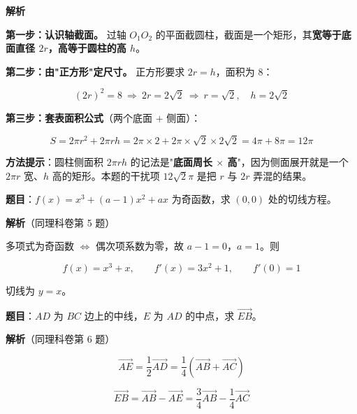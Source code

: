 \textbf{解析}

\textbf{第一步：认识轴截面。} 过轴 $O_1O_2$ 的平面截圆柱，截面是一个矩形，其\textbf{宽等于底面直径 $2r$，高等于圆柱的高 $h$}。

\textbf{第二步：由"正方形"定尺寸。} 正方形要求 $2r=h$，面积为 $8$：

\[(2r)^{2}=8\ \Longrightarrow\ 2r=2\sqrt2\ \Longrightarrow\ r=\sqrt2,\quad h=2\sqrt2\]

\textbf{第三步：套表面积公式}（两个底面 $+$ 侧面）：

\[S=2\pi r^{2}+2\pi rh=2\pi\times2+2\pi\times\sqrt2\times2\sqrt2=4\pi+8\pi=12\pi\]


\begin{gktip}
\textbf{方法提示}：圆柱侧面积 $2\pi rh$ 的记法是"\textbf{底面周长 $\times$ 高}"，因为侧面展开就是一个 $2\pi r$ 宽、$h$ 高的矩形。本题的干扰项 $12\sqrt2\pi$ 是把 $r$ 与 $2r$ 弄混的结果。
\end{gktip}

\par\medskip


\textbf{题目}：$f(x)=x^{3}+(a-1)x^{2}+ax$ 为奇函数，求 $(0,0)$ 处的切线方程。

\textbf{解析}（同理科卷第 5 题）

多项式为奇函数 $\iff$ 偶次项系数为零，故 $a-1=0$，$a=1$。则

\[f(x)=x^{3}+x,\qquad f'(x)=3x^{2}+1,\qquad f'(0)=1\]

切线为 $y=x$。


\par\medskip


\textbf{题目}：$AD$ 为 $BC$ 边上的中线，$E$ 为 $AD$ 的中点，求 $\overrightarrow{EB}$。

\textbf{解析}（同理科卷第 6 题）

\[\overrightarrow{AE}=\frac12\overrightarrow{AD}=\frac14\left(\overrightarrow{AB}+\overrightarrow{AC}\right)\]

\[\overrightarrow{EB}=\overrightarrow{AB}-\overrightarrow{AE}=\frac34\overrightarrow{AB}-\frac14\overrightarrow{AC}\]


\par\medskip


